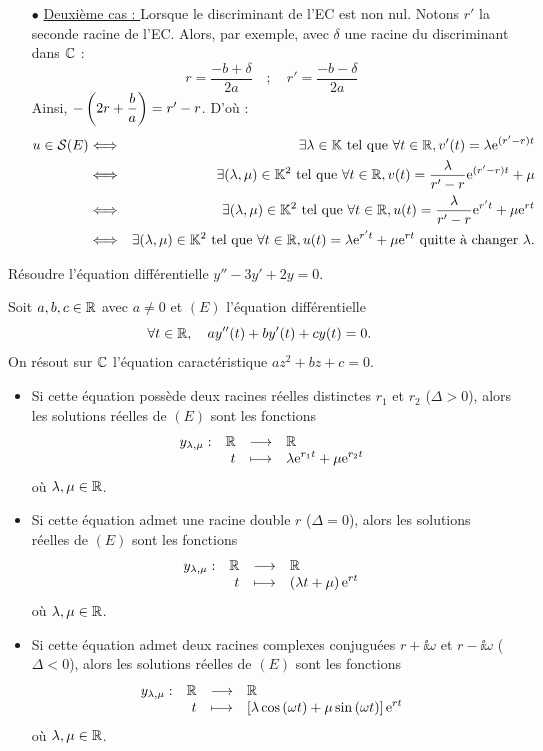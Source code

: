 \documentclass{magnolia}
\begin{document}
\begin{preuve}
\begin{victor}
\begin{itemize}
\item [$\bullet$] \underline{Deuxième cas : } Lorsque le discriminant de l'EC est non nul. Notons $r'$ la seconde racine de l'EC. Alors, par exemple, avec $\delta$ une racine du discriminant dans $\mathbb{C}$ :
\[r=\dfrac{-b+\delta}{2a} \quad ; \quad r'=\dfrac{-b-\delta}{2a}\]
Ainsi, $-\left(2r+\dfrac{b}{a}\right)=r'-r$. D'où :
\begin{eqnarray*}
u\in \mathcal{S}(E)&\Longleftrightarrow & \exists \lambda\in\mathbb{K} \text{ tel que } \forall t \in \mathbb{R}, v'(t)=\lambda{\rm e}^{(r'-r)t}\\
&\Longleftrightarrow & \exists (\lambda,\mu)\in\mathbb{K}^2 \text{ tel que } \forall t \in \mathbb{R}, v(t)=\frac{\lambda}{r'-r}{\rm e}^{(r'-r)t}+\mu\\
&\Longleftrightarrow & \exists (\lambda,\mu)\in\mathbb{K}^2 \text{ tel que } \forall t \in \mathbb{R}, u(t)=\frac{\lambda}{r'-r}{\rm e}^{r't}+\mu{\rm e}^{rt}\\
&\Longleftrightarrow & \exists (\lambda,\mu)\in\mathbb{K}^2 \text{ tel que } \forall t \in \mathbb{R}, u(t)=\lambda{\rm e}^{r't}+\mu{\rm e}^{rt} \text{ quitte à changer }\lambda.
\end{eqnarray*}
\end{itemize}
\end{victor}
\end{preuve}


\begin{exoUnique}
\exo Résoudre l'équation différentielle $y''-3y'+2y=0$.
\end{exoUnique}

\begin{proposition}[utile=-3]
Soit $a,b,c\in\mathbb{R}$ avec $a\neq 0$ et $(E)$ l'équation différentielle
\[\forall t\in\mathbb{R} ,\quad a y''(t)+by'(t)+cy(t)=0.\]
On résout sur $\mathbb{C}$ l'équation caractéristique $az^2+bz+c=0$.
\begin{itemize}
\item Si cette équation possède deux racines réelles distinctes $r_1$ et $r_2$
  ($\Delta> 0$), alors les solutions réelles de $(E)$ sont les fonctions
  \[\begin{array}[t]{lrcl} \displaystyle{y_{\lambda,\mu}} : & \displaystyle{\mathbb{R}} & \longrightarrow & \displaystyle{\mathbb{R}} \\ & \displaystyle{t} & \longmapsto & \displaystyle{\lambda {\rm e}^{r_1 t}+\mu {\rm e}^{r_2 t}} \end{array}\]
  où $\lambda,\mu\in\mathbb{R}$.
\item Si cette équation admet une racine double $r$ ($\Delta=0$), alors les
  solutions réelles de $(E)$ sont les fonctions
  \[\begin{array}[t]{lrcl} \displaystyle{y_{\lambda,\mu}} : & \displaystyle{\mathbb{R}} & \longrightarrow & \displaystyle{\mathbb{R}} \\ & \displaystyle{t} & \longmapsto & \displaystyle{\left(\lambda t+\mu\right){\rm e}^{r t}} \end{array}\]
  où $\lambda,\mu\in\mathbb{R}$.
\item Si cette équation admet deux racines complexes conjuguées $r+\ii\omega$ et
  $r-\ii\omega$ ($\Delta <0$), alors les solutions réelles de $(E)$ sont les
  fonctions
  \[\begin{array}[t]{lrcl} \displaystyle{y_{\lambda,\mu}} : & \displaystyle{\mathbb{R}} & \longrightarrow & \displaystyle{\mathbb{R}} \\ & \displaystyle{t} & \longmapsto & \displaystyle{\left[\lambda\cos\left(\omega t\right)+
    \mu\sin\left(\omega t\right)\right]{\rm e}^{r t}} \end{array}\]
  où $\lambda,\mu\in\mathbb{R}$.
\end{itemize}
\end{proposition}
\end{document}
